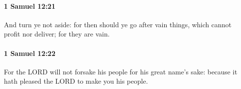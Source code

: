 		\paragraph{1 Samuel 12:21} %
			\label{1SAMUEL-12-21}

			And turn ye not aside: for then should ye go after vain things, which cannot profit nor deliver; for they are vain.


		\paragraph{1 Samuel 12:22} %
			\label{1SAMUEL-12-22}

			For the LORD will not forsake his people for his great name’s sake: because it hath pleased the LORD to make you his people.


